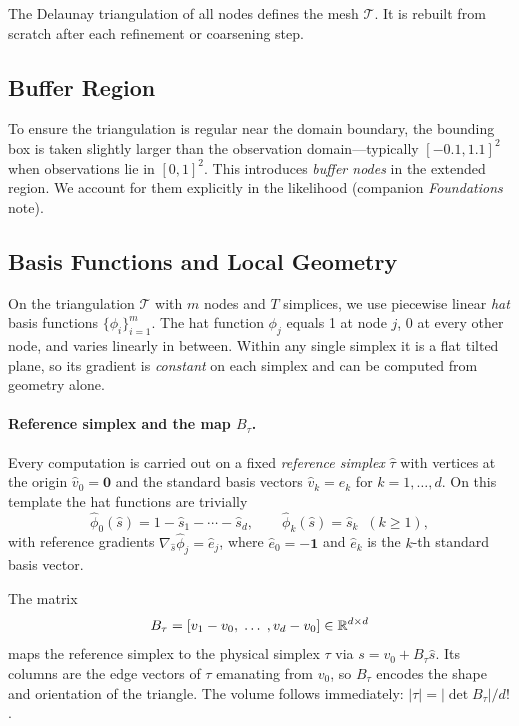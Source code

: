 \documentclass[11pt]{article}
\begin{document}
The Delaunay triangulation of all nodes defines the mesh $\mathcal{T}$.
It is rebuilt from scratch after each refinement or coarsening step.

\subsection{Buffer Region}

To ensure the triangulation is regular near the domain boundary, the bounding
box is taken slightly larger than the observation domain---typically
$[-0.1, 1.1]^2$ when observations lie in $[0,1]^2$.  This introduces
\emph{buffer nodes} in the extended region.  We account for them explicitly in
the likelihood (companion \emph{Foundations} note).

\subsection{Basis Functions and Local Geometry}

On the triangulation $\mathcal{T}$ with $m$ nodes and $T$ simplices, we use
piecewise linear \emph{hat} basis functions $\{\phi_i\}_{i=1}^m$.  The hat
function $\phi_j$ equals 1 at node $j$, 0 at every other node, and varies
linearly in between.  Within any single simplex it is a flat tilted plane, so
its gradient is \emph{constant} on each simplex and can be computed from
geometry alone.

\paragraph{Reference simplex and the map $B_\tau$.}
Every computation is carried out on a fixed \emph{reference simplex}
$\hat\tau$ with vertices at the origin $\hat{v}_0=\mathbf{0}$ and the
standard basis vectors $\hat{v}_k = e_k$ for $k=1,\ldots,d$.  On this
template the hat functions are trivially
\[
  \hat\phi_0(\hat s) = 1 - \hat s_1 - \cdots - \hat s_d, \qquad
  \hat\phi_k(\hat s) = \hat s_k \;\;(k\ge 1),
\]
with reference gradients $\nabla_{\hat s}\hat\phi_j = \hat{e}_j$, where
$\hat{e}_0 = -\mathbf{1}$ and $\hat{e}_k$ is the $k$-th standard basis
vector.

The matrix
\begin{equation}
  B_\tau = [v_1 - v_0, \;\ldots\;, v_d - v_0] \in \mathbb{R}^{d\times d}
\end{equation}
maps the reference simplex to the physical simplex $\tau$ via
$s = v_0 + B_\tau\hat s$.  Its columns are the edge vectors of $\tau$
emanating from $v_0$, so $B_\tau$ encodes the shape and orientation of the
triangle.  The volume follows immediately: $|\tau| = |\det B_\tau|/d!$.
\end{document}
